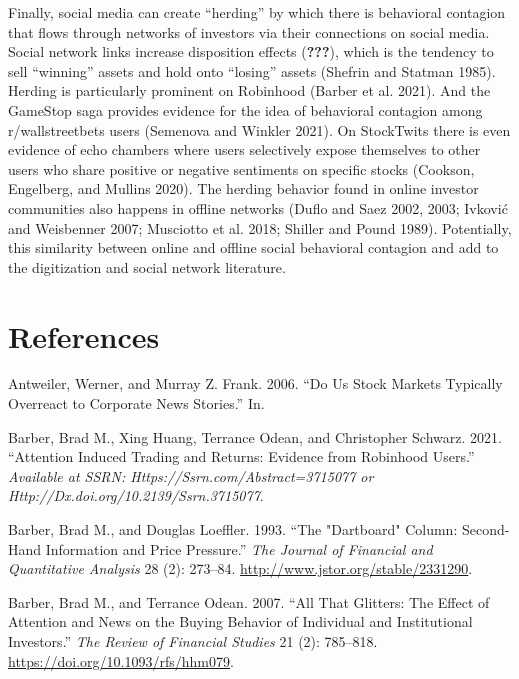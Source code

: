 \documentclass[12pt,]{article}
\begin{document}
Finally, social media can create ``herding'' by which there is
behavioral contagion that flows through networks of investors via their
connections on social media. Social network links increase disposition
effects ({\textbf{???}}), which is the tendency to sell ``winning''
assets and hold onto ``losing'' assets (Shefrin and Statman 1985).
Herding is particularly prominent on Robinhood (Barber et al. 2021). And
the GameStop saga provides evidence for the idea of behavioral contagion
among r/wallstreetbets users (Semenova and Winkler 2021). On StockTwits
there is even evidence of echo chambers where users selectively expose
themselves to other users who share positive or negative sentiments on
specific stocks (Cookson, Engelberg, and Mullins 2020). The herding
behavior found in online investor communities also happens in offline
networks (Duflo and Saez 2002, 2003; Ivković and Weisbenner 2007;
Musciotto et al. 2018; Shiller and Pound 1989). Potentially, this
similarity between online and offline social behavioral contagion and
add to the digitization and social network literature.

\hypertarget{references}{%
\section*{References}\label{references}}

\hypertarget{refs}{}
\leavevmode\hypertarget{ref-antweiler2006}{}%
Antweiler, Werner, and Murray Z. Frank. 2006. ``Do Us Stock Markets
Typically Overreact to Corporate News Stories.'' In.

\leavevmode\hypertarget{ref-barber2021}{}%
Barber, Brad M., Xing Huang, Terrance Odean, and Christopher Schwarz.
2021. ``Attention Induced Trading and Returns: Evidence from Robinhood
Users.'' \emph{Available at SSRN: Https://Ssrn.com/Abstract=3715077 or
Http://Dx.doi.org/10.2139/Ssrn.3715077}.

\leavevmode\hypertarget{ref-barber1993}{}%
Barber, Brad M., and Douglas Loeffler. 1993. ``The "Dartboard" Column:
Second-Hand Information and Price Pressure.'' \emph{The Journal of
Financial and Quantitative Analysis} 28 (2): 273--84.
\url{http://www.jstor.org/stable/2331290}.

\leavevmode\hypertarget{ref-barber2007}{}%
Barber, Brad M., and Terrance Odean. 2007. ``All That Glitters: The
Effect of Attention and News on the Buying Behavior of Individual and
Institutional Investors.'' \emph{The Review of Financial Studies} 21
(2): 785--818. \url{https://doi.org/10.1093/rfs/hhm079}.
\end{document}
